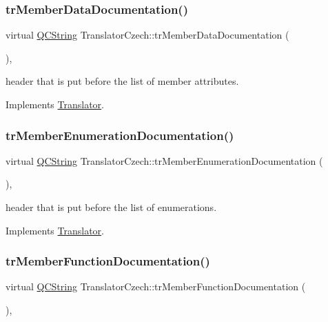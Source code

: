\subsubsection{\texorpdfstring{trMemberDataDocumentation()}{trMemberDataDocumentation()}}
{\footnotesize\ttfamily virtual \mbox{\hyperlink{class_q_c_string}{Q\+C\+String}} Translator\+Czech\+::tr\+Member\+Data\+Documentation (\begin{DoxyParamCaption}{ }\end{DoxyParamCaption})\hspace{0.3cm}{\ttfamily [inline]}, {\ttfamily [virtual]}}

header that is put before the list of member attributes. 

Implements \mbox{\hyperlink{class_translator}{Translator}}.

\mbox{\label{class_translator_czech_a5b49ac1def3ed8bbf005b09f3f139737}} 
\subsubsection{\texorpdfstring{trMemberEnumerationDocumentation()}{trMemberEnumerationDocumentation()}}
{\footnotesize\ttfamily virtual \mbox{\hyperlink{class_q_c_string}{Q\+C\+String}} Translator\+Czech\+::tr\+Member\+Enumeration\+Documentation (\begin{DoxyParamCaption}{ }\end{DoxyParamCaption})\hspace{0.3cm}{\ttfamily [inline]}, {\ttfamily [virtual]}}

header that is put before the list of enumerations. 

Implements \mbox{\hyperlink{class_translator}{Translator}}.

\mbox{\label{class_translator_czech_a34d478f257d27ca04cb304f458d281cd}} 
\subsubsection{\texorpdfstring{trMemberFunctionDocumentation()}{trMemberFunctionDocumentation()}}
{\footnotesize\ttfamily virtual \mbox{\hyperlink{class_q_c_string}{Q\+C\+String}} Translator\+Czech\+::tr\+Member\+Function\+Documentation (\begin{DoxyParamCaption}{ }\end{DoxyParamCaption})\hspace{0.3cm}{\ttfamily [inline]}, {\ttfamily [virtual]}}

